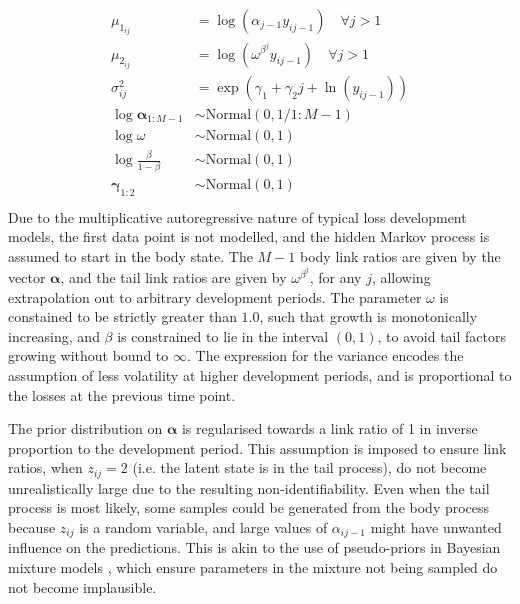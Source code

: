 \begin{align}
\begin{split}
    \mu_{1_{ij}} &= \log(\alpha_{j - 1} y_{ij-1}) \quad \forall j > 1\\
    \mu_{2_{ij}} &= \log(\omega^{\beta^{j}} y_{ij - 1}) \quad \forall j > 1\\
	\sigma_{ij}^2 &= \exp(\gamma_{1} + \gamma_{2} j + \ln(y_{ij-1}))\\
	\log \bm{\alpha}_{1:M - 1} &\sim \mathrm{Normal}(0, 1 / 1:M - 1)\\
    \log \omega &\sim \mathrm{Normal}(0, 1)\\
    \log \frac{\beta}{1 - \beta} &\sim \mathrm{Normal}(0, 1)\\
    \bm{\gamma}_{1:2} &\sim \mathrm{Normal}(0, 1)\\
\end{split}
\end{align}
%
Due to the multiplicative autoregressive nature of typical
loss development models, the first data point is not modelled,
and the hidden Markov process is assumed to start in the
body state.
The $M - 1$ body link ratios are given by the vector $\bm{\alpha}$,
and the tail link ratios are given by $\omega^{\beta^{j}}$, for any $j$,
allowing extrapolation out to arbitrary development periods.
The parameter $\omega$ is constained to be strictly greater than $1.0$,
such that growth is monotonically increasing,
and $\beta$ is constrained to lie in the interval $(0, 1)$, to avoid
tail factors growing without bound to $\infty$.
The expression for the variance encodes the assumption of
less volatility at higher development periods, and is proportional
to the losses at the previous time point.

The prior distribution on $\bm{\alpha}$ is regularised towards
a link ratio of 1 in inverse proportion to the development period.
This assumption is imposed to ensure link ratios, 
when $z_{ij} = 2$ (i.e. the latent state 
is in the tail process), do not become unrealistically
large due to the resulting non-identifiability. 
Even when the tail process
is most likely,
some samples could be generated from the body process because
$z_{ij}$ is a random variable, and large values of $\alpha_{ij-1}$
might have unwanted influence on the predictions.
This is akin to the use of pseudo-priors in Bayesian mixture
models \citep{carlinchib1995}, which ensure parameters in the mixture
not being sampled do not become implausible.

